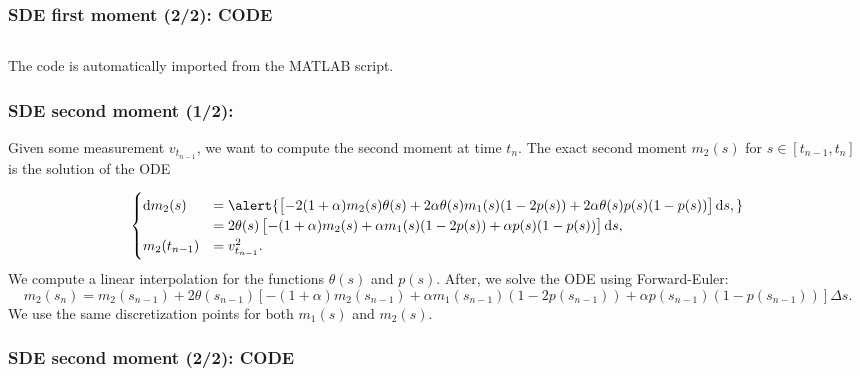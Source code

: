 \documentclass[aspectratio=169]{beamer}\usepackage[utf8]{inputenc}
\begin{document}
\begin{frame}\frametitle{SDE first moment (2/2): CODE} \label{m1_code}

\begin{center}
\begin{tabular}{|c|}
\toprule
{\footnotesize

}\\
\bottomrule
\end{tabular}
\end{center}

The code is automatically imported from the MATLAB script.

\end{frame}


\begin{frame}\frametitle{SDE second moment (1/2):} \label{m2}

Given some measurement $v_{t_{n-1}}$, we want to compute the second moment at time $t_n$. The exact second moment $m_2(s)$ for $s\in[t_{n-1},t_n]$ is the solution of the ODE

\begin{equation*}
\begin{cases}
\dif m_2(s)&=\alert{\left[-2(1+\alpha)m_2(s)\theta(s)+2\alpha\theta(s)m_1(s)(1-2p(s))+2\alpha\theta(s)p(s)(1-p(s))\right]\dif s,}\\
&=2\theta(s)\left[-(1+\alpha)m_2(s)+\alpha m_1(s)(1-2p(s))+\alpha p(s)(1-p(s))\right]\dif s,\\
m_2(t_{n-1})&=v^2_{t_{n-1}}.
\end{cases}
\end{equation*}
We compute a linear interpolation for the functions $\theta(s)$ and $p(s)$. After, we solve the ODE using Forward-Euler:
{\scriptsize
\begin{equation*}
m_2(s_n)=m_2(s_{n-1})+2\theta(s_{n-1})\left[-(1+\alpha)m_2(s_{n-1})+\alpha m_1(s_{n-1})(1-2p(s_{n-1}))+\alpha p(s_{n-1})(1-p(s_{n-1}))\right]\Delta s.
\end{equation*}}
We use the same discretization points for both $m_1(s)$ and $m_2(s)$.

\end{frame}


\begin{frame}\frametitle{SDE second moment (2/2): CODE} \label{m2_code}

\begin{center}
\begin{tabular}{|c|}
\toprule
{\footnotesize

}\\
\bottomrule
\end{tabular}
\end{center}

\end{frame}
\end{document}
